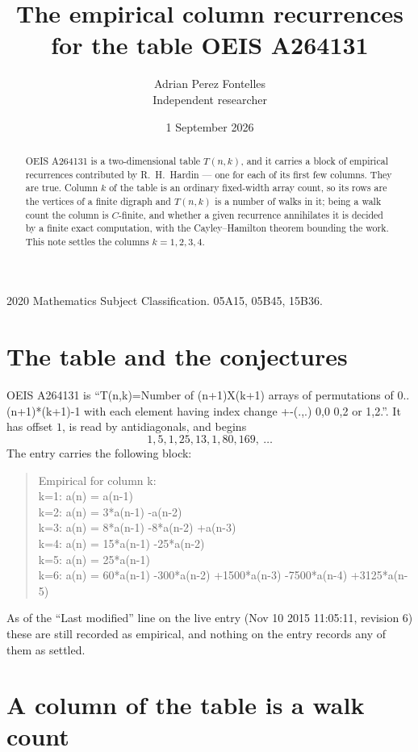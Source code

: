 \documentclass[11pt,a4paper]{article}
\title{The empirical column recurrences for the table OEIS A264131}
\author{Adrian Perez Fontelles\\ \small Independent researcher}
\date{1 September 2026}
\theoremstyle{plain}
\theoremstyle{definition}
\begin{document}
\maketitle

\begin{abstract}
OEIS A264131 is a two-dimensional table $T(n,k)$, and it carries a block of empirical
recurrences contributed by R.~H.~Hardin --- one for each of its first few columns. They are
true. Column $k$ of the table is an ordinary fixed-width array count, so its rows are the
vertices of a finite digraph and $T(n,k)$ is a number of walks in it; being a walk count the
column is $C$-finite, and whether a given recurrence annihilates it is decided by a finite
exact computation, with the Cayley--Hamilton theorem bounding the work. This note settles the columns $k=1, 2, 3, 4$.
\end{abstract}

\noindent\small 2020 Mathematics Subject Classification. 05A15, 05B45, 15B36.\normalsize

\section{The table and the conjectures}

OEIS A264131 is ``T(n,k)=Number of (n+1)X(k+1) arrays of permutations of 0..(n+1)*(k+1)-1 with each element having index change +-(.,.) 0,0 0,2 or 1,2.''. It has offset $1$, is
read by antidiagonals, and begins
\[
1, 5, 1, 25, 13, 1, 80, 169,\ \dots
\]
The entry carries the following block:
\begin{quote}\small
Empirical for column k:\\
k=1: a(n) = a(n-1)\\
k=2: a(n) = 3*a(n-1) -a(n-2)\\
k=3: a(n) = 8*a(n-1) -8*a(n-2) +a(n-3)\\
k=4: a(n) = 15*a(n-1) -25*a(n-2)\\
k=5: a(n) = 25*a(n-1)\\
k=6: a(n) = 60*a(n-1) -300*a(n-2) +1500*a(n-3) -7500*a(n-4) +3125*a(n-5)\\
\end{quote}
As of the ``Last modified'' line on the live entry (Nov 10 2015 11:05:11, revision 6) these are still
recorded as empirical, and nothing on the entry records any of them as settled.

\section{A column of the table is a walk count}
\end{document}
